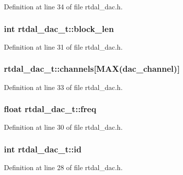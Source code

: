 Definition at line 34 of file rtdal\-\_\-dac.\-h.

\subsubsection[{block\-\_\-len}]{\setlength{\rightskip}{0pt plus 5cm}int rtdal\-\_\-dac\-\_\-t\-::block\-\_\-len}\label{structrtdal__dac__t_a716854e8850dfab1ddbcbd779352c678}


Definition at line 31 of file rtdal\-\_\-dac.\-h.

\subsubsection[{channels}]{ rtdal\-\_\-dac\-\_\-t\-::channels[{\bf M\-A\-X}(dac\-\_\-channel)]}\label{structrtdal__dac__t_a89737e1e20878d8efc67ad8f47b72195}


Definition at line 33 of file rtdal\-\_\-dac.\-h.

\subsubsection[{freq}]{\setlength{\rightskip}{0pt plus 5cm}float rtdal\-\_\-dac\-\_\-t\-::freq}\label{structrtdal__dac__t_afc905cd4e7aa8c25395806917a05a305}


Definition at line 30 of file rtdal\-\_\-dac.\-h.

\subsubsection[{id}]{\setlength{\rightskip}{0pt plus 5cm}int rtdal\-\_\-dac\-\_\-t\-::id}\label{structrtdal__dac__t_aa45909405d029611621f81816652122f}


Definition at line 28 of file rtdal\-\_\-dac.\-h.

